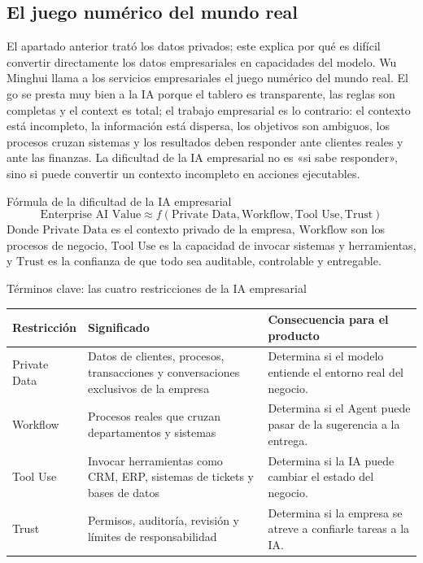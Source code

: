 \documentclass[a4paper]{article}
\begin{document}
\subsection{El juego numérico del mundo real}

El apartado anterior trató los datos privados; este explica por qué es difícil convertir directamente los datos empresariales en capacidades del modelo. Wu Minghui llama a los servicios empresariales el juego numérico del mundo real. El go se presta muy bien a la IA porque el tablero es transparente, las reglas son completas y el context es total; el trabajo empresarial es lo contrario: el contexto está incompleto, la información está dispersa, los objetivos son ambiguos, los procesos cruzan sistemas y los resultados deben responder ante clientes reales y ante las finanzas. La dificultad de la IA empresarial no es «si sabe responder», sino si puede convertir un contexto incompleto en acciones ejecutables.

\begin{importantbox}{Fórmula de la dificultad de la IA empresarial}
\[
\text{Enterprise AI Value} \approx f(\text{Private Data}, \text{Workflow}, \text{Tool Use}, \text{Trust})
\]
Donde \(\text{Private Data}\) es el contexto privado de la empresa, \(\text{Workflow}\) son los procesos de negocio, \(\text{Tool Use}\) es la capacidad de invocar sistemas y herramientas, y \(\text{Trust}\) es la confianza de que todo sea auditable, controlable y entregable.
\end{importantbox}

\begin{knowledgebox}{Términos clave: las cuatro restricciones de la IA empresarial}
\begin{tabularx}{\textwidth}{p{}p{}X}
\toprule
Restricción & Significado & Consecuencia para el producto \\
\midrule
Private Data & Datos de clientes, procesos, transacciones y conversaciones exclusivos de la empresa & Determina si el modelo entiende el entorno real del negocio. \\
Workflow & Procesos reales que cruzan departamentos y sistemas & Determina si el Agent puede pasar de la sugerencia a la entrega. \\
Tool Use & Invocar herramientas como CRM, ERP, sistemas de tickets y bases de datos & Determina si la IA puede cambiar el estado del negocio. \\
Trust & Permisos, auditoría, revisión y límites de responsabilidad & Determina si la empresa se atreve a confiarle tareas a la IA. \\
\bottomrule
\end{tabularx}
\end{knowledgebox}
\end{document}
